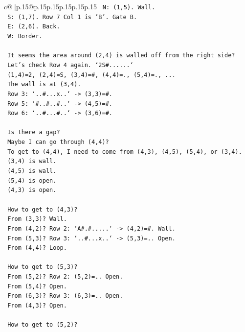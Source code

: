 \documentclass{article}
\begin{document}
{\begin{supertabular}{c@{$\;$}|p{.15\linewidth}@{}p{.15\linewidth}p{.15\linewidth}p{.15\linewidth}p{.15\linewidth}p{.15\linewidth}}
{{{\texttt{   N: (1,5). Wall.} \\
\texttt{   S: (1,7). Row 7 Col 1 is 'B'. Gate B.} \\
\texttt{   E: (2,6). Back.} \\
\texttt{   W: Border.} \\
\\ 
\texttt{   It seems the area around (2,4) is walled off from the right side?} \\
\texttt{   Let's check Row 4 again. `2S\#......`} \\
\texttt{   (1,4)=2, (2,4)=S, (3,4)=\#, (4,4)=., (5,4)=., ...} \\
\texttt{   The wall is at (3,4).} \\
\texttt{   Row 3: `..\#...x..` {-}> (3,3)=\#.} \\
\texttt{   Row 5: `\#..\#..\#..` {-}> (4,5)=\#.} \\
\texttt{   Row 6: `..\#...\#..` {-}> (3,6)=\#.} \\
\\ 
\texttt{   Is there a gap?} \\
\texttt{   Maybe I can go through (4,4)?} \\
\texttt{   To get to (4,4), I need to come from (4,3), (4,5), (5,4), or (3,4).} \\
\texttt{   (3,4) is wall.} \\
\texttt{   (4,5) is wall.} \\
\texttt{   (5,4) is open.} \\
\texttt{   (4,3) is open.} \\
\\ 
\texttt{   How to get to (4,3)?} \\
\texttt{   From (3,3)? Wall.} \\
\texttt{   From (4,2)? Row 2: `A\#.\#.....` {-}> (4,2)=\#. Wall.} \\
\texttt{   From (5,3)? Row 3: `..\#...x..` {-}> (5,3)=.. Open.} \\
\texttt{   From (4,4)? Loop.} \\
\\ 
\texttt{   How to get to (5,3)?} \\
\texttt{   From (5,2)? Row 2: (5,2)=.. Open.} \\
\texttt{   From (5,4)? Open.} \\
\texttt{   From (6,3)? Row 3: (6,3)=.. Open.} \\
\texttt{   From (4,3)? Open.} \\
\\ 
\texttt{   How to get to (5,2)?} \\
}}}
\end{supertabular}}
\end{document}
